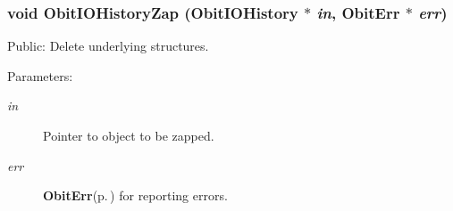 \subsubsection{\setlength{\rightskip}{0pt plus 5cm}void Obit\-IOHistory\-Zap ({\bf Obit\-IOHistory} $\ast$ {\em in}, {\bf Obit\-Err} $\ast$ {\em err})}\label{ObitIOHistory_8c_a9}


Public: Delete underlying structures. 

\begin{Desc}
\item[Parameters:]
\begin{description}
\item[{\em in}]Pointer to object to be zapped. \item[{\em err}]{\bf Obit\-Err}{\rm (p.\,\pageref{structObitErr})} for reporting errors. \end{description}
\end{Desc}

